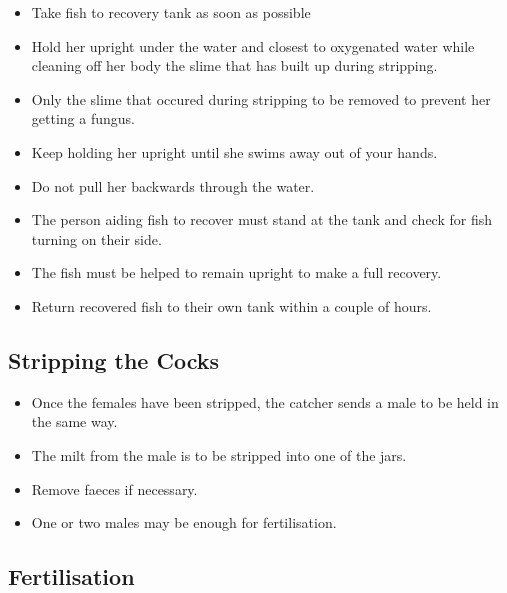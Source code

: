 \begin{itemize}
\item Take fish to recovery tank as soon as possible
\item Hold her upright under the water and closest to oxygenated water while cleaning off her body the slime
that has built up during stripping.
\item Only the slime that occured during stripping to be removed to prevent her getting a fungus.
\item Keep holding her upright until she swims away out of your hands. 
\item Do not pull her backwards through the water. 
\item The person aiding fish to recover must stand at the tank and check for fish turning on their side. 
\item The fish must be helped to remain upright to make a full recovery. 
\item Return recovered fish to their own tank within a couple of hours. 
\end{itemize}

\subsection{Stripping the Cocks}

\begin{itemize}
\item Once the females have been stripped, the catcher sends a male to be held in the same way. 
\item The milt from the male is to be stripped into one of the jars. 
\item Remove faeces if necessary. 
\item One or two males may be enough for fertilisation. 
\end{itemize}

\subsection{Fertilisation}

